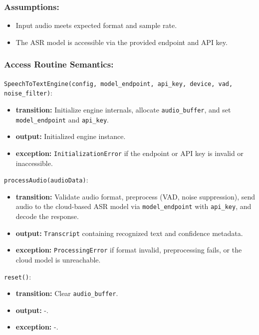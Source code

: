\documentclass[12pt, titlepage]{article}
\begin{document}
\subsubsection{Assumptions:}
\begin{itemize}
  \item Input audio meets expected format and sample rate.
  \item The ASR model is accessible via the provided endpoint and API key.
\end{itemize}

\subsubsection{Access Routine Semantics:}

\noindent\texttt{SpeechToTextEngine(config, model\_endpoint, api\_key, device, vad, noise\_filter)}:
\begin{itemize}
  \item \textbf{transition:} Initialize engine internals, allocate \texttt{audio\_buffer}, and set \texttt{model\_endpoint} and \texttt{api\_key}.
  \item \textbf{output:} Initialized engine instance.
  \item \textbf{exception:} \texttt{InitializationError} if the endpoint or API key is invalid or inaccessible.
\end{itemize}

\noindent\texttt{processAudio(audioData)}:
\begin{itemize}
  \item \textbf{transition:} Validate audio format, preprocess (VAD, noise suppression), send audio to the cloud-based ASR model via \texttt{model\_endpoint} with \texttt{api\_key}, and decode the response.
  \item \textbf{output:} \texttt{Transcript} containing recognized text and confidence metadata.
  \item \textbf{exception:} \texttt{ProcessingError} if format invalid, preprocessing fails, or the cloud model is unreachable.
\end{itemize}

\noindent\texttt{reset()}:
\begin{itemize}
  \item \textbf{transition:} Clear \texttt{audio\_buffer}.
  \item \textbf{output:} -.
  \item \textbf{exception:} -.
\end{itemize}
\end{document}
